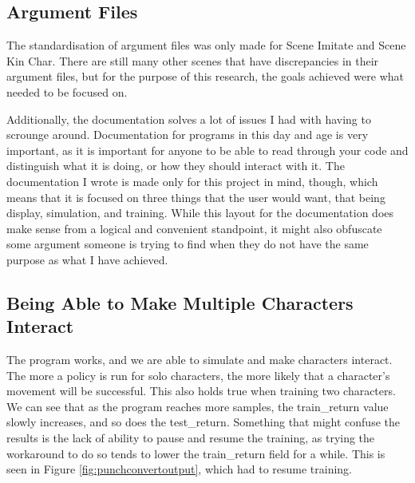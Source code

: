 \documentclass{l4proj}
\begin{document}
\subsection{Argument Files}
The standardisation of argument files was only made for Scene Imitate and Scene Kin Char. There are still many other scenes that have discrepancies in their argument files, but for the purpose of this research, the goals achieved were what needed to be focused on.

Additionally, the documentation solves a lot of issues I had with having to scrounge around. Documentation for programs in this day and age is very important, as it is important for anyone to be able to read through your code and distinguish what it is doing, or how they should interact with it. The documentation I wrote is made only for this project in mind, though, which means that it is focused on three things that the user would want, that being display, simulation, and training. While this layout for the documentation does make sense from a logical and convenient standpoint, it might also obfuscate some argument someone is trying to find when they do not have the same purpose as what I have achieved.
\pagebreak
\subsection{Being Able to Make Multiple Characters Interact}
The program works, and we are able to simulate and make characters interact. The more a policy is run for solo characters, the more likely that a character's movement will be successful. This also holds true when training two characters. We can see that as the program reaches more samples, the train\_return value slowly increases, and so does the test\_return. Something that might confuse the results is the lack of ability to pause and resume the training, as trying the workaround to do so tends to lower the train\_return field for a while. This is seen in Figure \ref{fig:punchconvertoutput}, which had to resume training.
\end{document}
